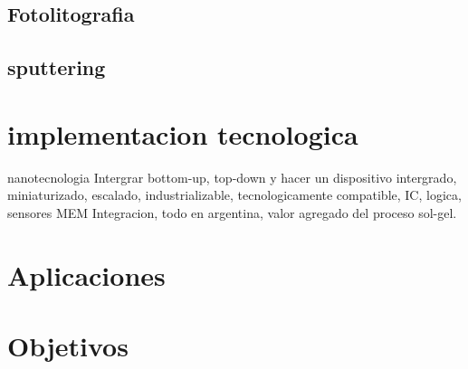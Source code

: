 \subsection{Fotolitografia}\label{sec:intro_fotolito}

\subsection{sputtering}

\section{implementacion tecnologica}
nanotecnologia\cite{Gimenez2017}
Intergrar bottom-up, top-down y hacer un dispositivo intergrado, miniaturizado, escalado, industrializable, tecnologicamente compatible, IC, logica, sensores MEM
Integracion, todo en argentina, valor agregado del proceso sol-gel.\cite{Volksen2010}

\section{Aplicaciones}

\section{Objetivos}